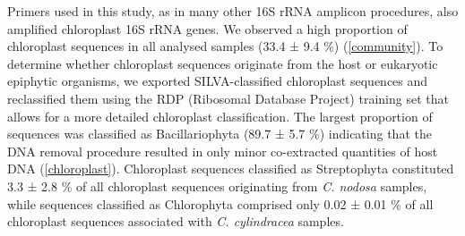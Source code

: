 \documentclass[12pt,]{article}
\begin{document}
Primers used in this study, as in many other 16S rRNA amplicon
procedures, also amplified chloroplast 16S rRNA genes. We observed a
high proportion of chloroplast sequences in all analysed samples (33.4 ±
9.4 \si{\percent}) (\autoref{community}). To determine whether
chloroplast sequences originate from the host or eukaryotic epiphytic
organisms, we exported SILVA-classified chloroplast sequences and
reclassified them using the RDP (Ribosomal Database Project) training
set that allows for a more detailed chloroplast classification. The
largest proportion of sequences was classified as Bacillariophyta (89.7
± 5.7 \si{\percent}) indicating that the DNA removal procedure resulted
in only minor co-extracted quantities of host DNA
(\autoref{chloroplast}). Chloroplast sequences classified as
Streptophyta constituted 3.3 ± 2.8 \si{\percent} of all chloroplast
sequences originating from \emph{C. nodosa} samples, while sequences
classified as Chlorophyta comprised only 0.02 ± 0.01 \si{\percent} of
all chloroplast sequences associated with \emph{C. cylindracea} samples.
\end{document}

